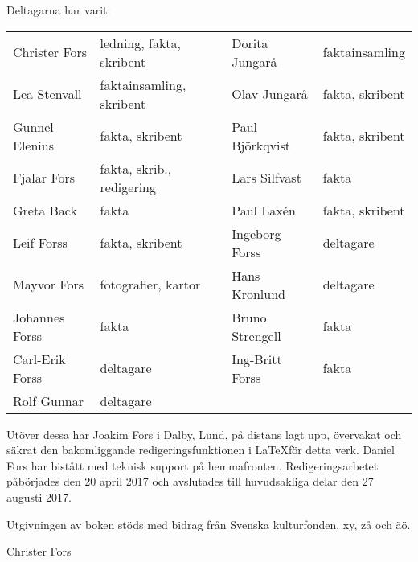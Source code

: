 Deltagarna har varit:

\begin{center}
  \begin{tabular}{l l l l}
    Christer Fors & ledning, fakta, skribent & Dorita Jungarå & faktainsamling \\
    Lea Stenvall & faktainsamling, skribent & Olav Jungarå & fakta, skribent \\
    Gunnel Elenius & fakta, skribent & Paul Björkqvist & fakta, skribent \\
    Fjalar Fors & fakta, skrib., redigering & Lars Silfvast & fakta \\
    Greta Back & fakta & Paul Laxén & fakta, skribent \\
    Leif Forss & fakta, skribent & Ingeborg Forss & deltagare \\
    Mayvor Fors & fotografier, kartor & Hans Kronlund & deltagare \\
    Johannes Forss & fakta & Bruno Strengell & fakta \\
    Carl-Erik Forss & deltagare & Ing-Britt Forss & fakta \\
    Rolf Gunnar & deltagare &  &  \\
  \end{tabular}
\end{center}

Utöver dessa har Joakim Fors i Dalby, Lund, på distans lagt upp, övervakat och säkrat den bakomliggande redigeringsfunktionen i \LaTeX för detta verk. Daniel Fors har bistått med teknisk support på hemmafronten. Redigeringsarbetet påbörjades den 20 april 2017 och avslutades till huvudsakliga delar den 27 augusti 2017.

Utgivningen av boken stöds med bidrag från Svenska kulturfonden, xy, zå och äö.


Christer Fors
